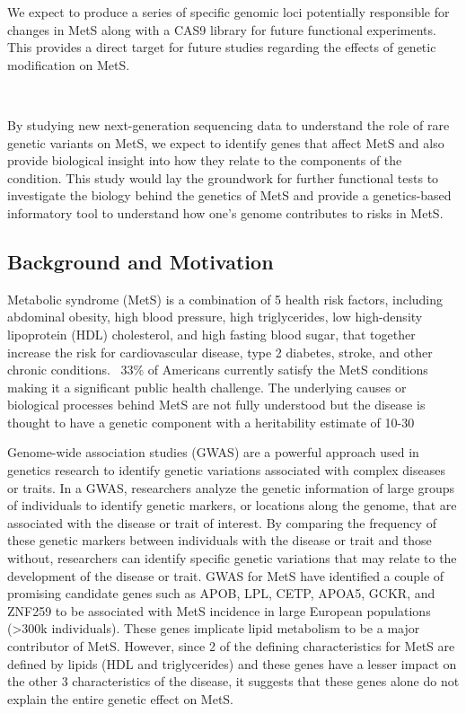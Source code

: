 \documentclass[11pt]{article}
\begin{document}
We expect to produce a series of specific genomic loci potentially responsible for changes in MetS along with a CAS9 library for future functional experiments. This provides a direct target for future studies regarding the effects of genetic modification on MetS.

\

By studying new next-generation sequencing data to understand the role of rare genetic variants on MetS, we expect to identify genes that affect MetS and also provide biological insight into how they relate to the components of the condition. This study would lay the groundwork for further functional tests to investigate the biology behind the genetics of MetS and provide a genetics-based informatory tool to understand how one's genome contributes to risks in MetS.

\newpage

\subsection*{Background and Motivation}

Metabolic syndrome (MetS) is a combination of 5 health risk factors, including abdominal obesity, high blood pressure, high triglycerides, low high-density lipoprotein (HDL) cholesterol, and high fasting blood sugar, that together increase the risk for cardiovascular disease, type 2 diabetes, stroke, and other chronic conditions. ~33\% of Americans currently satisfy the MetS conditions making it a significant public health challenge. The underlying causes or biological processes behind MetS are not fully understood but the disease is thought to have a genetic component with a heritability estimate of 10-30%

Genome-wide association studies (GWAS) are a powerful approach used in genetics research to identify genetic variations associated with complex diseases or traits. In a GWAS, researchers analyze the genetic information of large groups of individuals to identify genetic markers, or locations along the genome, that are associated with the disease or trait of interest. By comparing the frequency of these genetic markers between individuals with the disease or trait and those without, researchers can identify specific genetic variations that may relate to the development of the disease or trait. GWAS for MetS have identified a couple of promising candidate genes such as APOB, LPL, CETP, APOA5, GCKR, and ZNF259 to be associated with MetS incidence in large European populations (>300k individuals). These genes implicate lipid metabolism to be a major contributor of MetS. However, since 2 of the defining characteristics for MetS are defined by lipids (HDL and triglycerides) and these genes have a lesser impact on the other 3 characteristics of the disease, it suggests that these genes alone do not explain the entire genetic effect on MetS.
\end{document}
